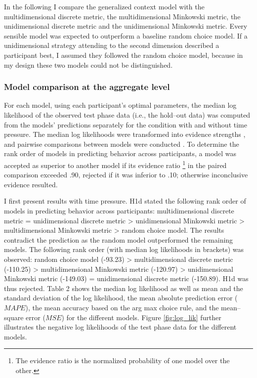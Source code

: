 \documentclass[a4paper,man,natbib]{apa6}
\begin{document}
In the following I compare the generalized context model with the multidimensional discrete metric, the multidimensional Minkowski metric, the unidimensional discrete metric and the unidimensional Minkowski metric. Every sensible model was expected to outperform a baseline random choice model. If a unidimensional strategy attending to the second dimension described a participant best, I assumed they followed the random choice model, because in my design these two models could not be distinguished. 

\subsubsection{Model comparison at the aggregate level} \label{sec:res_agg}
For each model, using each participant's optimal parameters, the median log likelihood of the observed test phase data (i.e., the hold--out data) was computed from the models' predictions separately for the condition with and without time pressure. The median log likelihoods were transformed into evidence strengths \citep[Akake weights,][]{wagenmakers2004aic}, and pairwise comparisons between models were conducted \citep[as in][p. 194]{wagenmakers2004aic}. To determine the rank order of models in predicting behavior across participants, a model was accepted as superior to another model if its evidence ratio \footnote{The evidence ratio is the normalized probability of one model over the other.} in the paired comparison exceeded .90, rejected if it was inferior to .10; otherwise inconclusive evidence resulted. 

I first present results with time pressure. H1d stated the following rank order of models in predicting behavior across participants: multidimensional discrete metric = unidimensional discrete metric > unidimensional Minkowski metric > multidimensional Minkowski metric > random choice model. The results contradict the prediction as the random model outperformed the remaining models. The following rank order (with median log likelihoods in brackets) was observed: random choice model (-93.23) > multidimensional discrete metric (-110.25) > multidimensional Minkowski metric (-120.97) > unidimensional Minkowski metric (-149.03) = unidimensional discrete metric (-150.89). H1d was thus rejected. Table 2 shows the median log likelihood as well as mean and the standard deviation of the log likelihood, the mean absolute prediction error ($MAPE$), the mean accuracy based on the arg max choice rule, and the mean--square error ($MSE$) for the different models. Figure \ref{fig:log_lik} further illustrates the negative log likelihoods of the test phase data for the different models. 
\end{document}

